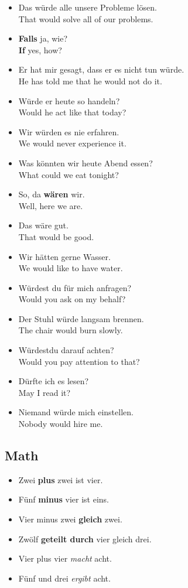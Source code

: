 \begin{itemize}
  \item  Das w{\"u}rde alle unsere Probleme l{\"o}sen. \\
  That would solve all of our problems.
  \item  \textbf{Falls} ja, wie? \\
  \textbf{If} yes, how?
  \item  Er hat mir gesagt, dass er es nicht tun w{\"u}rde. \\
  He has told me that he would not do it.
  \item  W{\"u}rde er heute so handeln? \\
  Would he act like that today?
  \item  Wir w{\"u}rden es nie erfahren. \\
  We would never experience it.
  \item  Was k{\"o}nnten wir heute Abend essen? \\
  What could we eat tonight?
  \item  So, da \textbf{w{\"a}ren} wir. \\
  Well, here we are.
  \item  Das w{\"a}re gut. \\
  That would be good.
  \item  Wir h{\"a}tten gerne Wasser. \\
  We would like to have water.
  \item  W{\"u}rdest du f{\"u}r mich anfragen? \\
  Would you ask on my behalf?
  \item  Der Stuhl w{\"u}rde langsam brennen. \\
  The chair would burn slowly.
  \item  W{\"u}rdestdu darauf achten? \\
  Would you pay attention to that?
  \item  D{\"u}rfte ich es lesen? \\
  May I read it?
  \item  Niemand w{\"u}rde mich einstellen. \\
  Nobody would hire me.
\end{itemize}


\pagebreak
\subsection{Math}

\begin{itemize}
  \item  Zwei \textbf{plus} zwei ist vier.
  \item  F{\"u}nf \textbf{minus} vier ist eins.
  \item  Vier minus zwei \textbf{gleich} zwei.
  \item  Zw{\"o}lf \textbf{geteilt durch} vier gleich drei.
  \item  Vier plus vier \textit{macht} acht.
  \item  F{\"u}nf und drei \textit{ergibt} acht.
\end{itemize}


